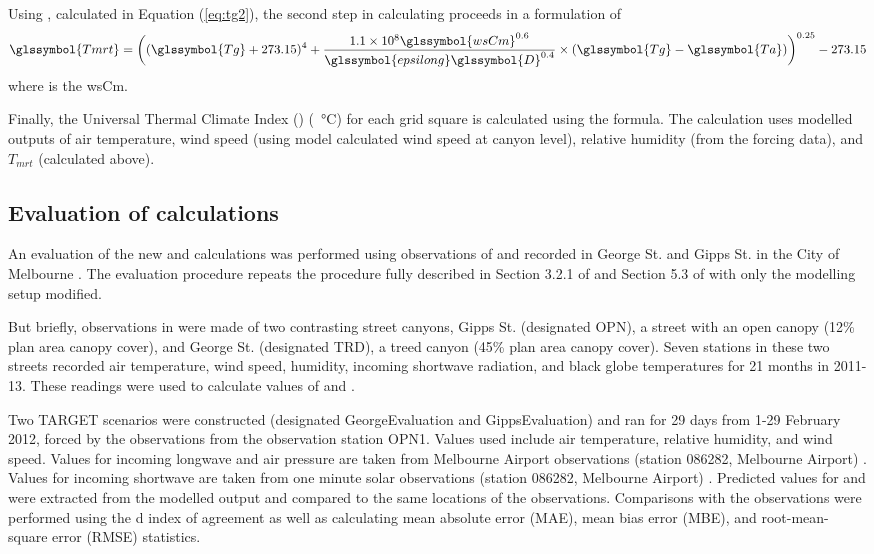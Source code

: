 \documentclass[final,3p,times,authoryear]{elsarticle}
\begin{document}
Using , calculated in Equation (\ref{eq:tg2}), the second step in calculating  proceeds in a formulation of \cite{Kantor2011} 
\begin{equation}\label{eq:tmrtbucket}
  \glssymbol{Tmrt} = 
  \bigg(
   (\glssymbol{Tg}+273.15)^{4} + 
    \frac{1.1 \times 10^{8}  \glssymbol{wsCm}^{0.6}}{\glssymbol{epsilong}  \glssymbol{D}^{0.4}}
    \times 
     (\glssymbol{Tg}-\glssymbol{Ta})
    \bigg)^{0.25} - 273.15
\end{equation}
 where  is the \glsdesc{wsCm}.

Finally, the Universal Thermal Climate Index () (\SI{}{\degreeCelsius}) for each grid square is calculated using the \cite{Brode2009u}  formula. The calculation uses modelled outputs of air temperature, wind speed (using model calculated wind speed at canyon level), relative humidity (from the forcing data), and $T_{mrt}$ (calculated above).




\subsection{Evaluation of  calculations}\label{sec:methods_eval}

An evaluation of the new  and  calculations was performed using observations of  and  recorded in George St. and Gipps St. in the City of Melbourne \citep{Coutts2015}. The evaluation procedure repeats the procedure fully described in Section 3.2.1 of \cite{Nice2018} and Section 5.3 of \cite{Nice2016} with only the modelling setup modified. 

But briefly, observations in \cite{Coutts2015} were made of two contrasting street canyons, Gipps St. (designated OPN), a street with an open canopy (12\% plan area canopy cover), and George St. (designated TRD), a treed canyon (45\% plan area canopy cover). Seven stations in these two streets recorded air temperature, wind speed, humidity, incoming shortwave radiation, and black globe temperatures for 21 months in 2011-13. These readings were used to calculate values of  and . 


Two TARGET scenarios were constructed (designated GeorgeEvaluation and GippsEvaluation) and ran for 29 days from 1-29 February 2012, forced by the observations from the observation station OPN1. Values used include air temperature, relative humidity, and wind speed. Values for incoming longwave and air pressure are taken from Melbourne Airport observations (station 086282, Melbourne Airport) \citep{BOM2016b}. Values for incoming shortwave are taken from one minute solar observations (station 086282, Melbourne Airport) \citep{BOM2016}. Predicted values for  and  were extracted from the modelled output and compared to the same locations of the observations. Comparisons with the observations were performed using the \cite{Willmott1981} d index of agreement as well as calculating mean absolute error (MAE), mean bias error (MBE), and root-mean-square error (RMSE) statistics.
\end{document}
